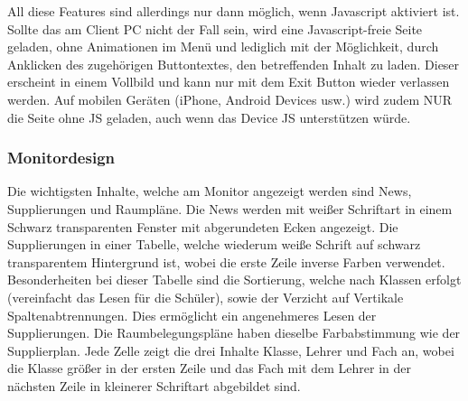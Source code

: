 All diese Features sind allerdings nur dann möglich, wenn Javascript aktiviert ist. Sollte das am Client PC nicht der Fall sein, wird eine Javascript-freie Seite geladen, ohne Animationen im Menü und lediglich mit der Möglichkeit, durch Anklicken des zugehörigen Buttontextes, den betreffenden Inhalt zu laden. Dieser erscheint in einem Vollbild und kann nur mit dem Exit Button wieder verlassen werden. Auf mobilen Geräten (iPhone, Android Devices usw.) wird zudem NUR die Seite ohne JS geladen, auch wenn das Device JS unterstützen würde.
\subsubsection{Monitordesign}
Die wichtigsten Inhalte, welche am Monitor angezeigt werden sind News, Supplierungen und Raumpläne. Die News werden mit weißer Schriftart in einem Schwarz transparenten Fenster mit abgerundeten Ecken angezeigt. Die Supplierungen in einer Tabelle, welche wiederum weiße Schrift auf schwarz transparentem Hintergrund ist, wobei die erste Zeile inverse Farben verwendet. Besonderheiten bei dieser Tabelle sind die Sortierung, welche nach Klassen erfolgt (vereinfacht das Lesen für die Schüler), sowie der Verzicht auf Vertikale Spaltenabtrennungen. Dies ermöglicht ein angenehmeres Lesen der Supplierungen. Die Raumbelegungspläne haben dieselbe Farbabstimmung wie der Supplierplan. Jede Zelle zeigt die drei Inhalte Klasse, Lehrer und Fach an, wobei die Klasse größer in der ersten Zeile und das Fach mit dem Lehrer in der nächsten Zeile in kleinerer Schriftart abgebildet sind.